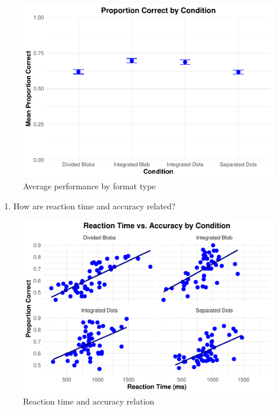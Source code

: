 \documentclass[
  man,floatsintext]{apa6}
\providecommand{\tightlist}{%
  \setlength{\itemsep}{0pt}\setlength{\parskip}{0pt}}
\begin{document}
\begin{figure}
\centering
\includegraphics{Sebastian_WA11_files/figure-latex/plot1-1.pdf}
\caption{\label{fig:plot1}Average performance by format type}
\end{figure}

\clearpage

\begin{enumerate}
\def\labelenumi{\arabic{enumi}.}
\setcounter{enumi}{1}
\tightlist
\item
  How are reaction time and accuracy related?
\end{enumerate}

\begin{figure}
\centering
\includegraphics{Sebastian_WA11_files/figure-latex/plot2-1.pdf}
\caption{\label{fig:plot2}Reaction time and accuracy relation}
\end{figure}
\end{document}
